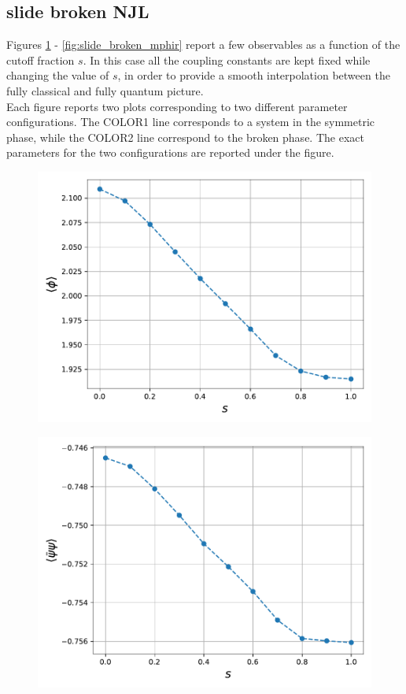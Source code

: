 \subsection{slide broken NJL}
Figures \ref{fig:slide_broken_phi} - \ref{fig:slide_broken_mphir} report a few observables as a function of the cutoff fraction $s$. In this case all the coupling constants are kept fixed while changing the value of $s$, in order to provide a smooth interpolation between the fully classical and fully quantum picture. \\
Each figure reports two plots corresponding to two different parameter configurations. The COLOR1 line corresponds to a system in the symmetric phase, while the COLOR2 line correspond to the broken phase. The exact parameters for the two configurations are reported under the figure.
\begin{figure}
    \centering
    \begin{minipage}{0.45\textwidth}
        \includegraphics[scale=0.52]{figures/slide_broken/phi.pdf}
        \label{fig:slide_broken_phi}
    \end{minipage}
    \hfill
    \begin{minipage}{0.45\textwidth}
        \includegraphics[scale=0.52]{figures/slide_broken/cond.pdf}

\end{minipage}
\end{figure}
